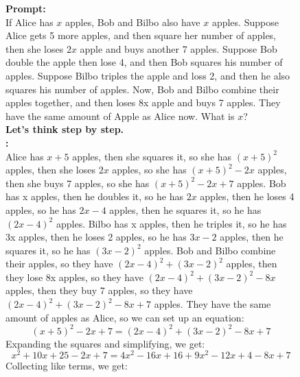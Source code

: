 \begin{figure}[H]
\begin{AIbox}{\DV}
{\bf Prompt:} \\
{\scriptsize
If Alice has $x$ apples, Bob and Bilbo also have $x$ apples. Suppose Alice gets 5 more apples, and then square her number of apples, then she loses $2x$ apple and buys another 7 apples. Suppose Bob double the apple then lose 4, and then Bob squares his number of apples. Suppose Bilbo triples the apple and loss 2, and then he also squares his number of apples. Now, Bob and Bilbo combine their apples together, and then loses 8x apple and buys 7 apples. They have the same amount of Apple as Alice now. What is $x$? \\
\textbf{Let's think step by step.}
}\\

{\bf \DV:} \\
{\scriptsize
Alice has $x + 5$ apples, then she squares it, so she has $(x + 5)^2$ apples, then she loses $2x$ apples, so she has $(x + 5)^2 - 2x$ apples, then she buys 7 apples, so she has $(x + 5)^2 - 2x + 7$ apples.
Bob has x apples, then he doubles it, so he has $2x$ apples, then he loses 4 apples, so he has $2x - 4$ apples, then he squares it, so he has $(2x - 4)^2$ apples.
Bilbo has x apples, then he triples it, so he has 3x apples, then he loses 2 apples, so he has $3x - 2$ apples, then he squares it, so he has $(3x - 2)^2$ apples.
Bob and Bilbo combine their apples, so they have $(2x - 4)^2 + (3x - 2)^2$ apples, then they lose 8x apples, so they have $(2x - 4)^2 + (3x - 2)^2 - 8x$ apples, then they buy 7 apples, so they have $(2x - 4)^2 + (3x - 2)^2 - 8x + 7$ apples.
They have the same amount of apples as Alice, so we can set up an equation:
$$(x + 5)^2 - 2x + 7 = (2x - 4)^2 + (3x - 2)^2 - 8x + 7$$
Expanding the squares and simplifying, we get:
$$x^2 + 10x + 25 - 2x + 7 = 4x^2 - 16x + 16 + 9x^2 - 12x + 4 - 8x + 7$$
Collecting like terms, we get:
}
\end{AIbox}
\end{figure}

